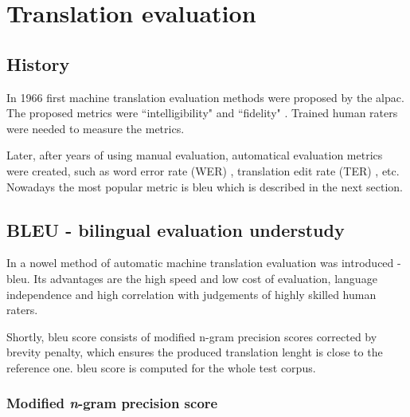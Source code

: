 \section{}
\label{section:bpe}

\section{Translation evaluation}

\subsection{History}

In 1966 first machine translation evaluation methods were proposed
by the \acrfull{alpac}.
The proposed metrics were ``intelligibility" and ``fidelity"
\citep[p~67]{Translation1966}.
Trained human raters were needed to measure the metrics.

Later, after years of using manual evaluation, automatical evaluation
metrics were created, such as word error rate (WER) \cite{Su1992},
translation edit rate (TER) \cite{Snover2006}, etc.
Nowadays the most popular metric is \acrfull{bleu} which is described
in the next section.


\subsection{BLEU - bilingual evaluation understudy}

In \cite{Papineni02bleu} a nowel method of automatic machine
translation evaluation was introduced - \acrfull{bleu}.
Its advantages are the high speed and low cost of evaluation,
language independence and high correlation with judgements
of highly skilled human raters.

Shortly, \acrshort{bleu} score consists of modified n-gram precision scores
corrected by brevity penalty,
which ensures the produced translation lenght is close to the reference one.
\acrshort{bleu} score is computed for the whole test corpus.

\subsubsection*{Modified \textit{n}-gram precision score}

